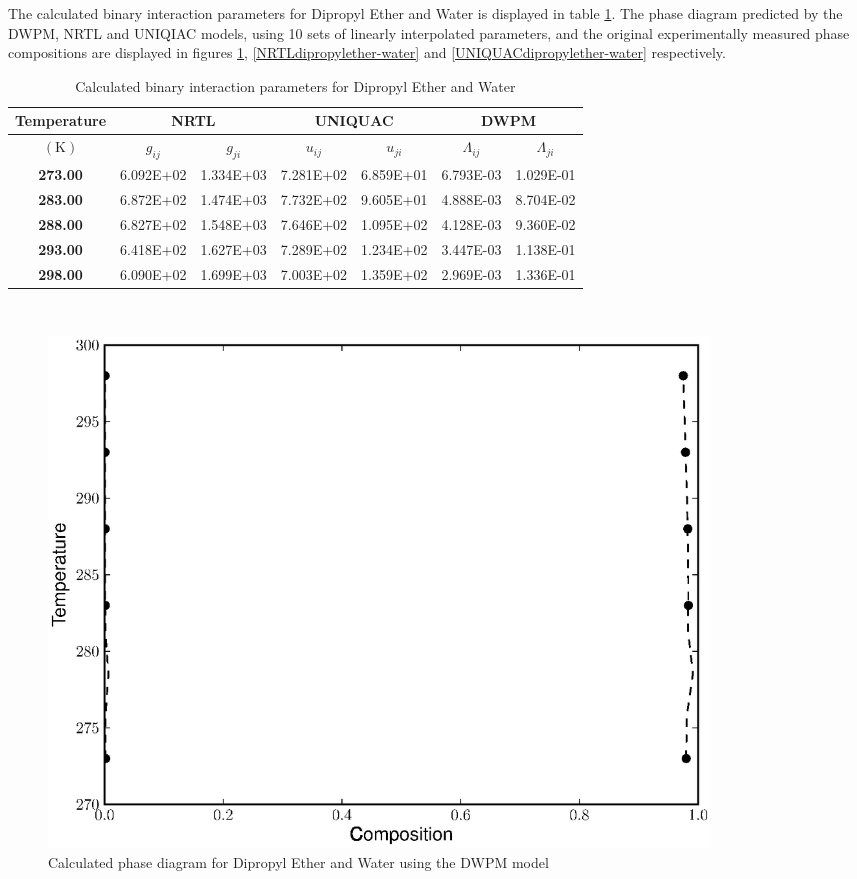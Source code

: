 The calculated binary interaction parameters for  Dipropyl Ether and Water is displayed in table \ref{dipropylether-waterTable}. The phase diagram predicted by the DWPM, NRTL and UNIQIAC models, using 10 sets of linearly interpolated parameters, and the original experimentally measured phase compositions are displayed in figures \ref{DWPMdipropylether-water}, \ref{NRTLdipropylether-water} and \ref{UNIQUACdipropylether-water} respectively.\\

\begin{table}
\begin{tabularx}{\textwidth}{c|cc|cc|cc}
\hline
\textbf{Temperature}&\multicolumn{2}{c|}{\textbf{NRTL}}&\multicolumn{2}{c|}{\textbf{UNIQUAC}}&\multicolumn{2}{c}{\textbf{DWPM}}\\
\hline
\hline 
$\left(\mathrm{K}\right)$&$g_{ij}$&$g_{ji}$&$u_{ij}$&$u_{ji}$&$\Lambda_{ij}$&$\Lambda_{ji}$\\
\hline
\textbf{ 273.00 } & 6.092E+02 & 1.334E+03 & 7.281E+02 & 6.859E+01 & 6.793E-03 & 1.029E-01\\
\textbf{ 283.00 } & 6.872E+02 & 1.474E+03 & 7.732E+02 & 9.605E+01 & 4.888E-03 & 8.704E-02\\
\textbf{ 288.00 } & 6.827E+02 & 1.548E+03 & 7.646E+02 & 1.095E+02 & 4.128E-03 & 9.360E-02\\
\textbf{ 293.00 } & 6.418E+02 & 1.627E+03 & 7.289E+02 & 1.234E+02 & 3.447E-03 & 1.138E-01\\
\textbf{ 298.00 } & 6.090E+02 & 1.699E+03 & 7.003E+02 & 1.359E+02 & 2.969E-03 & 1.336E-01\\
\hline
\end{tabularx}\\
\caption{Calculated binary interaction parameters for Dipropyl Ether and Water} \label{dipropylether-waterTable}
\end{table}

\begin{figure}[hp]
\centering
\includegraphics[width = 0.85\textwidth]{Results_Parts/BinaryParams/dipropylether-water/DWPM/PhaseDiagram.eps}
\caption{Calculated phase diagram for Dipropyl Ether and Water using the DWPM model} \label{DWPMdipropylether-water}
\end{figure}

